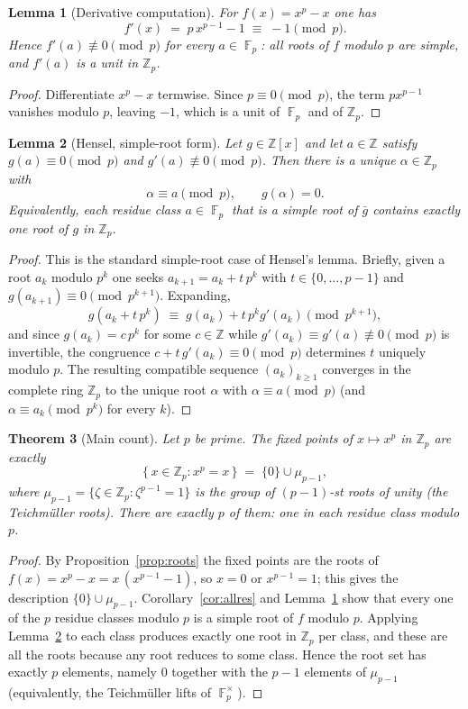 \documentclass[11pt]{article}
\newtheorem{theorem}{Theorem}
\newtheorem{lemma}[theorem]{Lemma}
\theoremstyle{definition}
\DeclareMathOperator{\F}{\mathbb{F}}
\newcommand{\Zp}{\mathbb{Z}_p}
\newcommand{\Z}{\mathbb{Z}}
\begin{document}
\begin{lemma}[Derivative computation]\label{lem:deriv}
For $f(x)=x^{p}-x$ one has
\[
  f'(x) \;=\; p\,x^{p-1}-1 \;\equiv\; -1 \pmod p .
\]
Hence $f'(a)\not\equiv 0\pmod p$ for every $a\in\F_p$: all roots of $f$ modulo
$p$ are \emph{simple}, and $f'(a)$ is a unit in $\Zp$.
\end{lemma}

\begin{proof}
Differentiate $x^{p}-x$ termwise. Since $p\equiv 0\pmod p$, the term
$p x^{p-1}$ vanishes modulo $p$, leaving $-1$, which is a unit of $\F_p$ and of
$\Zp$.
\end{proof}

\begin{lemma}[Hensel, simple-root form]\label{lem:hensel}
Let $g\in\Z[x]$ and let $a\in\Z$ satisfy $g(a)\equiv 0\pmod p$ and
$g'(a)\not\equiv 0\pmod p$. Then there is a unique $\alpha\in\Zp$ with
\[
  \alpha\equiv a \pmod p, \qquad g(\alpha)=0 .
\]
Equivalently, each residue class $a\in\F_p$ that is a simple root of $\bar g$
contains exactly one root of $g$ in $\Zp$.
\end{lemma}

\begin{proof}
This is the standard simple-root case of Hensel's lemma. Briefly, given a root
$a_k$ modulo $p^{k}$ one seeks $a_{k+1}=a_k+t\,p^{k}$ with $t\in\{0,\dots,p-1\}$
and $g(a_{k+1})\equiv 0\pmod{p^{k+1}}$. Expanding,
\[
  g(a_k+t\,p^{k}) \;\equiv\; g(a_k) + t\,p^{k} g'(a_k) \pmod{p^{k+1}},
\]
and since $g(a_k)=c\,p^{k}$ for some $c\in\Z$ while $g'(a_k)\equiv g'(a)\not\equiv
0\pmod p$ is invertible, the congruence $c+t\,g'(a_k)\equiv 0\pmod p$ determines
$t$ uniquely modulo $p$. The resulting compatible sequence $(a_k)_{k\ge 1}$
converges in the complete ring $\Zp$ to the unique root $\alpha$ with
$\alpha\equiv a\pmod p$ (and $\alpha\equiv a_k\pmod{p^{k}}$ for every $k$).
\end{proof}

\begin{theorem}[Main count]\label{thm:count}
Let $p$ be prime. The fixed points of $x\mapsto x^{p}$ in $\Zp$ are exactly
\[
  \{\,x\in\Zp : x^{p}=x\,\} \;=\; \{0\}\cup\mu_{p-1},
\]
where $\mu_{p-1}=\{\zeta\in\Zp:\zeta^{p-1}=1\}$ is the group of
$(p-1)$-st roots of unity (the Teichm\"uller roots). There are exactly $p$ of
them: one in each residue class modulo $p$.
\end{theorem}

\begin{proof}
By Proposition~\ref{prop:roots} the fixed points are the roots of
$f(x)=x^{p}-x=x\,(x^{p-1}-1)$, so $x=0$ or $x^{p-1}=1$; this gives the
description $\{0\}\cup\mu_{p-1}$. Corollary~\ref{cor:allres} and
Lemma~\ref{lem:deriv} show that every one of the $p$ residue classes modulo $p$
is a simple root of $f$ modulo $p$. Applying Lemma~\ref{lem:hensel} to each
class produces exactly one root in $\Zp$ per class, and these are all the roots
because any root reduces to some class. Hence the root set has exactly $p$
elements, namely $0$ together with the $p-1$ elements of $\mu_{p-1}$
(equivalently, the Teichm\"uller lifts of $\F_p^{\times}$).
\end{proof}
\end{document}
